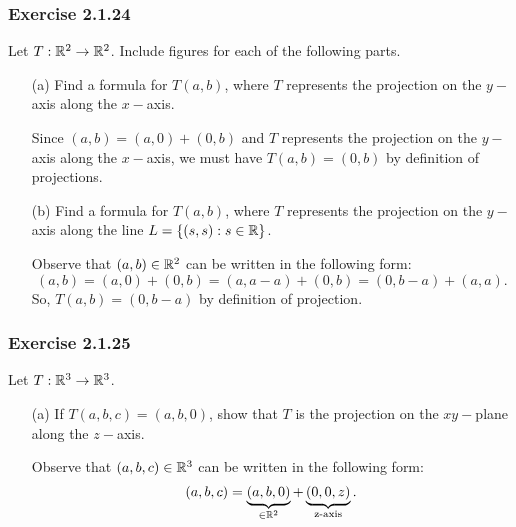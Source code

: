 \subsubsection{Exercise 2.1.24} Let \( T: \mathbb{R}^{2} \to \mathbb{R}^{2} \). Include figures for each of the following parts.
\begin{enumerate}
    \item[(a)] Find a formula for \( T(a,b) \), where \( T  \) represents the projection on the \( y- \)axis along the \( x- \)axis.
        \begin{solution}
        Since \( (a,b) = (a,0) + (0,b)  \) and \( T  \) represents the projection on the \( y- \)axis along the \( x- \)axis, we must have \( T(a,b) = (0,b) \) by definition of projections.
        \end{solution}
    \item[(b)] Find a formula for \( T(a,b)  \), where \( T \) represents the projection on the \( y- \)axis along the line \( L = \{ (s,s) : s \in \mathbb{R}  \}  \).
        \begin{solution}
        Observe that \( (a,b) \in \mathbb{R}^{2} \) can be written in the following form:
        \[  (a,b) = (a,0) + (0,b) = (a, a - a ) + (0,b) = (0,b-a) + (a,a).  \]
        So, \( T(a,b) = (0,b-a) \) by definition of projection.
        \end{solution}
\end{enumerate}

\subsubsection{Exercise 2.1.25} Let \( T: \mathbb{R}^{3} \to \mathbb{R}^{3} \).
\begin{enumerate}
    \item[(a)] If \( T(a,b,c) = (a,b,0)  \), show that \( T  \) is the projection on the \( xy- \)plane along the \( z- \)axis.
        \begin{solution}
        Observe that \( (a,b,c) \in \mathbb{R}^{3} \) can be written in the following form:
        \[  (a,b,c) = \underbrace{(a,b, 0)}_{\in \mathbb{R}^{2}} + \underbrace{(0,0,z)}_{\text{z-axis}}. \]
        \end{solution}
\end{enumerate}


